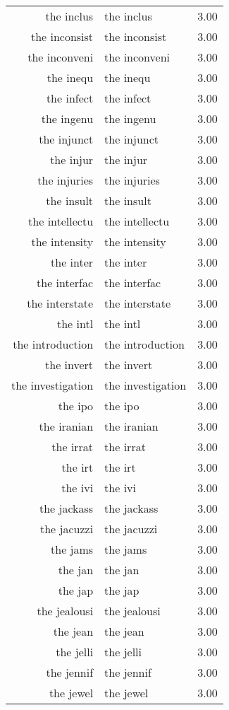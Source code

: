 \begin{table}[ht]
\begin{tabular}{rlr}
  the inclus & the inclus & 3.00 \\ 
  the inconsist & the inconsist & 3.00 \\ 
  the inconveni & the inconveni & 3.00 \\ 
  the inequ & the inequ & 3.00 \\ 
  the infect & the infect & 3.00 \\ 
  the ingenu & the ingenu & 3.00 \\ 
  the injunct & the injunct & 3.00 \\ 
  the injur & the injur & 3.00 \\ 
  the injuries & the injuries & 3.00 \\ 
  the insult & the insult & 3.00 \\ 
  the intellectu & the intellectu & 3.00 \\ 
  the intensity & the intensity & 3.00 \\ 
  the inter & the inter & 3.00 \\ 
  the interfac & the interfac & 3.00 \\ 
  the interstate & the interstate & 3.00 \\ 
  the intl & the intl & 3.00 \\ 
  the introduction & the introduction & 3.00 \\ 
  the invert & the invert & 3.00 \\ 
  the investigation & the investigation & 3.00 \\ 
  the ipo & the ipo & 3.00 \\ 
  the iranian & the iranian & 3.00 \\ 
  the irrat & the irrat & 3.00 \\ 
  the irt & the irt & 3.00 \\ 
  the ivi & the ivi & 3.00 \\ 
  the jackass & the jackass & 3.00 \\ 
  the jacuzzi & the jacuzzi & 3.00 \\ 
  the jams & the jams & 3.00 \\ 
  the jan & the jan & 3.00 \\ 
  the jap & the jap & 3.00 \\ 
  the jealousi & the jealousi & 3.00 \\ 
  the jean & the jean & 3.00 \\ 
  the jelli & the jelli & 3.00 \\ 
  the jennif & the jennif & 3.00 \\ 
  the jewel & the jewel & 3.00 \\ 

\end{tabular}
\end{table}
